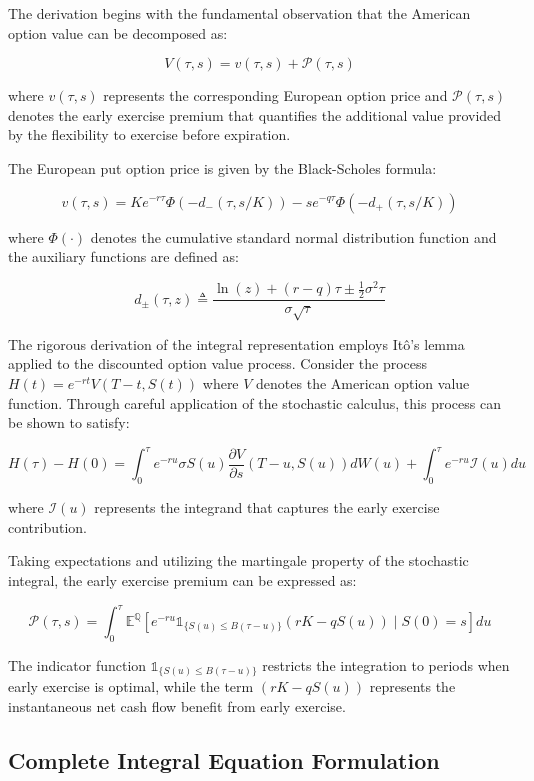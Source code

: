 \documentclass[
  american,
  11pt,
  11pt,
  letterpaper,
  onecolumn]{article}
\newcommand{\mathbbm}[1]{\mathbb{#1}}
\begin{document}
The derivation begins with the fundamental observation that the American
option value can be decomposed as:

\[V(\tau,s) = v(\tau,s) + \mathcal{P}(\tau,s) \tag{3.1}\]

where \(v(\tau,s)\) represents the corresponding European option price
and \(\mathcal{P}(\tau,s)\) denotes the early exercise premium that
quantifies the additional value provided by the flexibility to exercise
before expiration.

The European put option price is given by the Black-Scholes formula:

\[v(\tau,s) = K e^{-r\tau}\Phi(-d_-(\tau,s/K)) - s e^{-q\tau}\Phi(-d_+(\tau,s/K)) \tag{3.2}\]

where \(\Phi(\cdot)\) denotes the cumulative standard normal
distribution function and the auxiliary functions are defined as:

\[d_{\pm}(\tau,z) \triangleq \frac{\ln(z) + (r-q)\tau \pm \frac{1}{2}\sigma^2\tau}{\sigma\sqrt{\tau}} \tag{3.3}\]

The rigorous derivation of the integral representation employs Itô's
lemma applied to the discounted option value process. Consider the
process \(H(t) = e^{-rt}V(T-t, S(t))\) where \(V\) denotes the American
option value function. Through careful application of the stochastic
calculus, this process can be shown to satisfy:

\[H(\tau) - H(0) = \int_0^\tau e^{-ru} \sigma S(u) \frac{\partial V}{\partial s}(T-u, S(u)) dW(u) + \int_0^\tau e^{-ru} \mathcal{I}(u) du \tag{3.4}\]

where \(\mathcal{I}(u)\) represents the integrand that captures the
early exercise contribution.

Taking expectations and utilizing the martingale property of the
stochastic integral, the early exercise premium can be expressed as:

\[\mathcal{P}(\tau,s) = \int_0^\tau \mathbb{E}^{\mathbb{Q}}\left[e^{-ru} \mathbbm{1}_{\{S(u) \leq B(\tau-u)\}} (rK - qS(u)) \mid S(0) = s\right] du \tag{3.5}\]

The indicator function \(\mathbbm{1}_{\{S(u) \leq B(\tau-u)\}}\)
restricts the integration to periods when early exercise is optimal,
while the term \((rK - qS(u))\) represents the instantaneous net cash
flow benefit from early exercise.

\subsection{Complete Integral Equation
Formulation}\label{complete-integral-equation-formulation}
\end{document}
